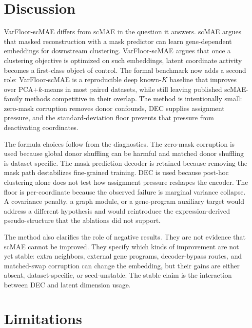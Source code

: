 \documentclass[11pt]{article}
\begin{document}
\section{Discussion}

VarFloor-scMAE differs from scMAE in the question it answers. scMAE argues that masked reconstruction with a mask predictor can learn gene-dependent embeddings for downstream clustering. VarFloor-scMAE argues that once a clustering objective is optimized on such embeddings, latent coordinate activity becomes a first-class object of control. The formal benchmark now adds a second role: VarFloor-scMAE is a reproducible deep known-$K$ baseline that improves over PCA+$k$-means in most paired datasets, while still leaving published scMAE-family methods competitive in their overlap. The method is intentionally small: zero-mask corruption removes donor confounds, DEC supplies assignment pressure, and the standard-deviation floor prevents that pressure from deactivating coordinates.

The formula choices follow from the diagnostics. The zero-mask corruption is used because global donor shuffling can be harmful and matched donor shuffling is dataset-specific. The mask-prediction decoder is retained because removing the mask path destabilizes fine-grained training. DEC is used because post-hoc clustering alone does not test how assignment pressure reshapes the encoder. The floor is per-coordinate because the observed failure is marginal variance collapse. A covariance penalty, a graph module, or a gene-program auxiliary target would address a different hypothesis and would reintroduce the expression-derived pseudo-structure that the ablations did not support.

The method also clarifies the role of negative results. They are not evidence that scMAE cannot be improved. They specify which kinds of improvement are not yet stable: extra neighbors, external gene programs, decoder-bypass routes, and matched-swap corruption can change the embedding, but their gains are either absent, dataset-specific, or seed-unstable. The stable claim is the interaction between DEC and latent dimension usage.

\section{Limitations}
\end{document}
